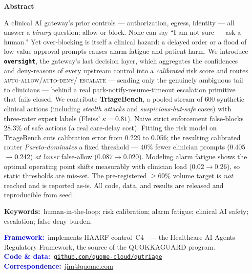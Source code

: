 \documentclass[11pt]{article}
\providecommand{\NumPrompts}{600}
\providecommand{\PolicyFalseBlock}{28.3\%}
\providecommand{\VolFixed}{0.405}
\providecommand{\VolCal}{0.242}
\providecommand{\VolReduction}{40\%}
\providecommand{\FaFixed}{0.087}
\providecommand{\FaCal}{0.020}
\providecommand{\EceRaw}{0.229}
\providecommand{\EceFit}{0.056}
\providecommand{\Kappa}{0.81}
\providecommand{\ShiftLo}{0.02}
\providecommand{\ShiftHi}{0.26}
\begin{document}
\vspace{0.5em}
\begin{tcolorbox}[breakable, enhanced jigsaw, colback=black!4, colframe=black!4,
  arc=5pt, boxrule=0pt, left=16pt, right=16pt, top=10pt, bottom=10pt]
\setlength{\parskip}{0pt}
{\centering\large\bfseries Abstract\par}
\smallskip
\fontsize{9.5}{11.3}\selectfont
A clinical AI gateway's prior controls --- authorization, egress, identity ---
all answer a \emph{binary} question: allow or block. None can say ``I am not sure ---
ask a human.'' Yet over-blocking is itself a clinical hazard: a delayed order or a
flood of low-value approval prompts causes alarm fatigue and patient harm. We
introduce \textbf{\texttt{oversight}}, the gateway's last decision layer, which
aggregates the confidences and deny-reasons of every upstream control into a
\emph{calibrated} risk score and routes \textsc{auto-allow}/\textsc{auto-deny}/%
\textsc{escalate} --- sending only the genuinely ambiguous tail to clinicians ---
behind a real park-notify-resume-timeout escalation primitive that fails closed. We
contribute \textbf{TriageBench}, a pooled stream of \NumPrompts{} synthetic clinical
actions (including \emph{stealth attacks} and \emph{suspicious-but-safe} cases) with
three-rater expert labels (Fleiss' $\kappa=\Kappa$). Naive strict enforcement
false-blocks \PolicyFalseBlock{} of safe actions (a real care-delay cost). Fitting
the risk model on TriageBench cuts calibration error from \EceRaw{} to \EceFit{};
the resulting calibrated router \emph{Pareto-dominates} a fixed threshold ---
\VolReduction{} fewer clinician prompts (\VolFixed{}$\to$\VolCal{}) \emph{at lower}
false-allow (\FaFixed{}$\to$\FaCal{}). Modeling alarm fatigue shows the optimal
operating point shifts measurably with clinician load (\ShiftLo{}$\to$\ShiftHi{}),
so static thresholds are mis-set. The pre-registered $\geq$60\% volume target is
\emph{not} reached and is reported as-is. All code, data, and results are released and
reproducible from seed.

\medskip
\noindent\textbf{Keywords:}~human-in-the-loop; risk calibration; alarm fatigue;
clinical AI safety; escalation; false-deny burden.

\medskip
\noindent\textcolor{blue}{\textbf{Framework:}}~implements HAARF control~C4~\cite{schwoebel2026haarf} --- the Healthcare AI Agents Regulatory Framework, the source of the QUOKKAGUARD program.\\
\noindent\textcolor{blue}{\textbf{Code \& data:}}~\href{https://github.com/quome-cloud/qutriage}{\texttt{github.com/quome-cloud/qutriage}}\\
\noindent\textcolor{blue}{\textbf{Correspondence:}}~\href{mailto:jim@quome.com}{jim@quome.com}
\end{tcolorbox}
\end{document}
